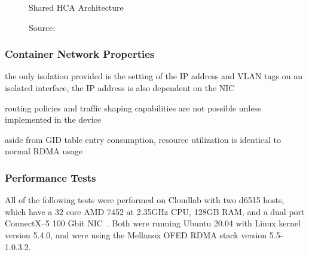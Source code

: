 \documentclass[12pt,titlepage]{article}
\begin{document}
\begin{figure}
	\centering
	\caption{Shared HCA Architecture}
	\caption*{Source:~\cite{mellanoxdockermacvlan}}
\end{figure}

\subsubsection*{Container Network Properties}
\begin{description}[nolistsep,font={{\scshape\bfseries}}]
	\item[Network Isolation] the only isolation provided is the setting of the IP address and VLAN tags on an isolated interface, the IP address is also dependent on the NIC
	\item[Controllability] routing policies and traffic shaping capabilities are not possible unless implemented in the device
	\item[Resource Utilization] aside from GID table entry consumption, resource utilization is identical to normal RDMA usage
\end{description}

\subsubsection*{Performance Tests}
All of the following tests were performed on Cloudlab with two d6515 hosts, which have a 32 core AMD 7452 at 2.35GHz CPU, 128GB RAM, and a dual port ConnectX--5 100 Gbit NIC~\cite{cloudlab}. 
Both were running Ubuntu 20.04 with Linux kernel version 5.4.0, and were using the Mellanox OFED RDMA stack version 5.5-1.0.3.2.
\end{document}
